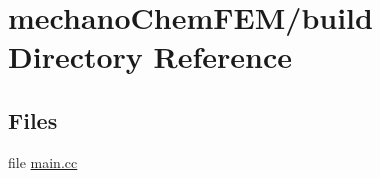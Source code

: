 \section{mechano\-Chem\-F\-E\-M/build Directory Reference}
\label{dir_1f4411000c7471c55b77bc4d17eedf55}
\subsection*{Files}
\begin{DoxyCompactItemize}
\item 
file \hyperlink{main_8cc}{main.\-cc}
\end{DoxyCompactItemize}
